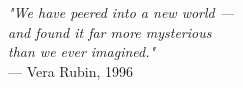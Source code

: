 \begin{flushright}
\emph{"We have peered into a new world — \\
and found it far more mysterious\\
than we ever imagined."}\\
— Vera Rubin, 1996
\end{flushright}
